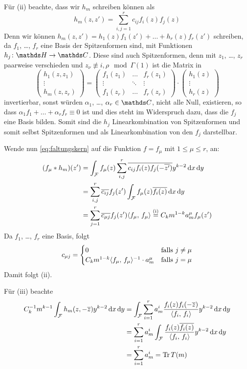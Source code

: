 \begin{bewe}
	Für (ii) beachte, dass wir $h_m$ schreiben können als
	\[
	h_m(z,z') = \sum_{i,j=1}^r c_{ij}f_i(z)f_j(z)
	\]
	Denn wir können $h_m(z, z') = h_1(z) f_1(z') + \ldots + h_r(z) f_r(z')$ schreiben, da $f_1$, \ldots, $f_r$ eine Basis der Spitzenformen sind, mit Funktionen $h_j\colon \HH \ra \CC$.
	Diese sind auch Spitzenformen, denn mit $z_1$, \ldots, $z_r$ paarweise verschieden und $z_\nu \not\equiv i, \rho \mod \Gamma(1)$ ist die Matrix in
	\[
	\begin{pmatrix}
	h_1(z,z_1) \\
	\vdots \\
	h_m(z,z_r)
	\end{pmatrix}
	= \begin{pmatrix}
	f_1(z_1) & \ldots & f_r(z_1) \\
	\vdots & \ddots & \vdots \\
	f_1(z_r) & \ldots & f_r(z_r)
	\end{pmatrix}
	\cdot 
	\begin{pmatrix}
	h_1(z) \\
	\vdots \\
	h_r(z)
	\end{pmatrix}
	\]
	invertierbar, sonst würden $\alpha_1$, \ldots, $\alpha_r \in \CC$, nicht alle Null, existieren, so dass $\alpha_1 f_1 + \ldots + \alpha_r f_r \equiv 0$ ist und dies steht im Widerspruch dazu, dass die $f_j$ eine Basis bilden.
	Somit sind die $h_j$ Linearkombination von Spitzenformen und somit selbst Spitzenformen und als Linearkombination von den $f_j$ darstellbar.
	
	Wende nun \eqref{eq:faltungskern} auf die Funktion $f = f_\mu$ mit $1 \leq \mu \leq r$, an:
	\[\begin{split}
	(f_\mu * h_m)(z')
	&= \int_\F f_\mu(z) \sum_{i,j}^r \conj{c_{ij} f_i(z) f_j(-\conj{z'})} y^{k-2} \opd x \opd y \\
	&= \sum_{i,j}^r \conj{c_{ij}} f_j(z') \int_\F f_\mu(z) \conj{f_i(z)} \opd x \opd y \\
	&= \sum_{j=1}^r \conj{c_{\mu j}} f_j(z') \scalarprd{f_\mu}{f_\mu}
	\stackrel{\text{(i)}}{=} C_km^{1-k} a_m^\mu f_\mu(z')
	\end{split}
	\]
	Da $f_1$, \ldots, $f_r$ eine Basis, folgt
	\[
	c_{\mu j} =
	\begin{cases}
	0 & \text{falls } j \not= \mu \\
	C_k m^{1-k} \scalarprd{f_\mu}{f_\mu}^{-1} \cdot a_m^\mu & \text{falls } j = \mu
	\end{cases}
	\]
	Damit folgt (ii).
	
	Für (iii) beachte
	\[\begin{split}
	C_k^{-1} m^{k-1} \int_\F h_m(z, -\conj{z}) y^{k-2}\opd x \opd y
	&= \int_\F \sum_{i=1}^r a_m^i \frac{f_i(z)f_i(-\conj z)}{\scalarprd{f_i}{f_i}} y^{k-2} \opd x \opd y \\
	&= \sum_{i=1}^r a_m^i\int_\F \frac{f_i(z) \conj{f_i(z)}}{\scalarprd{f_i}{f_i}} y ^{k-2} \opd x \opd y \\
	&= \sum_{i=1}^r a_m^i = \Tr T(m)
	\end{split}
	\]
\end{bewe}

